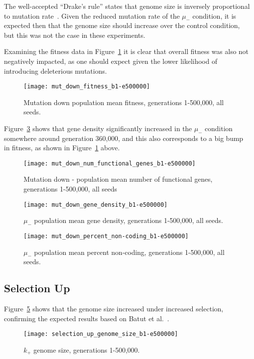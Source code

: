 The well-accepted ``Drake's rule'' states that genome size is inversely proportional to mutation rate~\cite{drake1991constant}. Given the reduced mutation rate of the $\mu_-$ condition, it is expected then that the genome size should increase over the control condition, but this was not the case in these experiments. 

Examining the fitness data in Figure~\ref{fig:mut_down_fitness} it is clear that overall fitness was also not negatively impacted, as one should expect given the lower likelihood of introducing deleterious mutations. 

\begin{figure}[H]
	\centering
	\texttt{[image: mut\_down\_fitness\_b1-e500000]}
	\caption[Mutation down fitness]{Mutation down population mean fitness, generations 1-500,000, all seeds.}
	\label{fig:mut_down_fitness}
\end{figure} 

Figure~\ref{fig:mut_down_gene_density} shows that gene density significantly increased in the $\mu_-$ condition somewhere around generation 360,000, and this also corresponds to a big bump in fitness, as shown in Figure~\ref{fig:mut_down_fitness} above. 

\begin{figure}[H]
	\centering
	\texttt{[image: mut\_down\_num\_functional\_genes\_b1-e500000]}
	\caption[Mutation down number of functional genes]{Mutation down - population mean number of functional genes, generations 1-500,000, all seeds}
	\label{fig:mut_down_num_functional_genes}
\end{figure}

\begin{figure}[H]
	\centering
	\texttt{[image: mut\_down\_gene\_density\_b1-e500000]}
	\caption[Mutation down gene density]{$\mu_-$ population mean gene density, generations 1-500,000, all seeds.}
	\label{fig:mut_down_gene_density}
\end{figure}


\begin{figure}[H]
	\centering
	\texttt{[image: mut\_down\_percent\_non-coding\_b1-e500000]}
	\caption[Mutation down percent non-coding]{$\mu_-$ population mean percent non-coding, generations 1-500,000, all seeds.}
	\label{fig:mut_down_perc_non-coding}
\end{figure}


\subsection{Selection Up}
Figure~\ref{fig:selection_up_genome_size} shows that the genome size increased under increased selection, confirming the expected results based on Batut et al.~\cite{Batut.2013}. 
\begin{figure}[H]
	\centering
	\texttt{[image: selection\_up\_genome\_size\_b1-e500000]}
	\caption[Selection up genome size]{$k_+$ genome size, generations 1-500,000.}
	\label{fig:selection_up_genome_size}
\end{figure}

